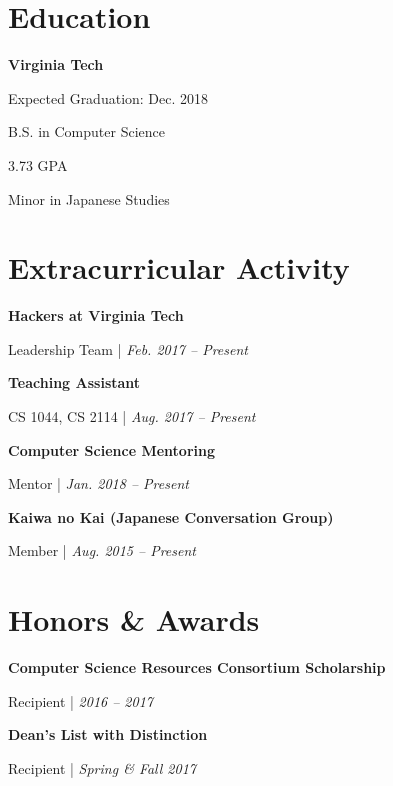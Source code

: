 \documentclass[9pt]{extarticle}
\newcommand{\Subsection}[2]{
    {\normalsize\bfseries\color{subsection}#1}
    \begin{trivlist}
        \color{bullet}
        #2
    \end{trivlist}
}
\newcommand{\ChronoItem}[2]{
    \item {\color{bullet}#1 | {\footnotesize\textit{#2}}}
}
\newcommand{\vsubspace}{\vspace{2em}}
\newcommand{\vmainspace}{\vspace{3em}}
\begin{document}
\begin{paracol}{2}
\begin{rightcolumn}
        \section{Education}
            \Subsection{Virginia Tech}{
                \item Expected Graduation: Dec. 2018
                \item B.S. in Computer Science
                \item 3.73 GPA
                \item Minor in Japanese Studies
            }
        \vmainspace
        \section{Extracurricular Activity}
            \Subsection{Hackers at Virginia Tech}{
                \ChronoItem{Leadership Team}{Feb. 2017 -- Present}
            }
            \vsubspace
            \Subsection{Teaching Assistant}{
                \ChronoItem{CS 1044, CS 2114}{Aug. 2017 -- Present}
            }
            \vsubspace
            \Subsection{Computer Science Mentoring}{
                \ChronoItem{Mentor}{Jan. 2018 -- Present}
            }
            \vsubspace
            \Subsection{Kaiwa no Kai (Japanese Conversation Group)}{
                \ChronoItem{Member}{Aug. 2015 -- Present}
            }
        \vmainspace
        \section{Honors \& Awards}
            \Subsection{Computer Science Resources Consortium Scholarship}{
                \ChronoItem{Recipient}{2016 -- 2017}
            }
            \vsubspace
            \Subsection{Dean's List with Distinction}{
                \ChronoItem{Recipient}{Spring \& Fall 2017}
            }
    \end{rightcolumn}
\end{paracol}
\end{document}
